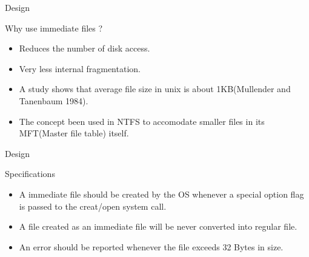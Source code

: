 \documentclass{beamer}
\begin{document}
\begin{frame}{Design}
\begin{Huge}
Why use immediate files ? \linebreak
\end{Huge}
\begin{itemize}
\item Reduces the number of disk access.
\item Very less internal fragmentation.
\item A study shows that average file size in unix is about 1KB(Mullender and Tanenbaum 1984).
\item The concept been used in NTFS to accomodate smaller files in its MFT(Master file table) itself.
\end{itemize}


\end{frame}



\begin{frame}{Design}
\begin{Huge}
Specifications
\linebreak
\end{Huge}

\begin{itemize}
\item A immediate file should be created by the OS whenever a special option flag is passed to the creat/open system call.
\item A file created as an immediate file will be never converted into regular file.
\item An error should be reported whenever the file exceeds 32 Bytes in size. 
\end{itemize}
\end{frame}
\end{document}
